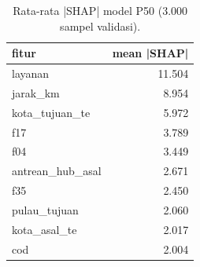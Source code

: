 \begin{table}[ht]
\centering\small
\begin{tabular}{lr}
\toprule
fitur & mean |SHAP| \\
\midrule
layanan & 11.504 \\
jarak\_km & 8.954 \\
kota\_tujuan\_te & 5.972 \\
f17 & 3.789 \\
f04 & 3.449 \\
antrean\_hub\_asal & 2.671 \\
f35 & 2.450 \\
pulau\_tujuan & 2.060 \\
kota\_asal\_te & 2.017 \\
cod & 2.004 \\
\bottomrule
\end{tabular}
\caption{Rata-rata |SHAP| model P50 (3.000 sampel validasi).}
\label{tab:t1_shap}
\end{table}

